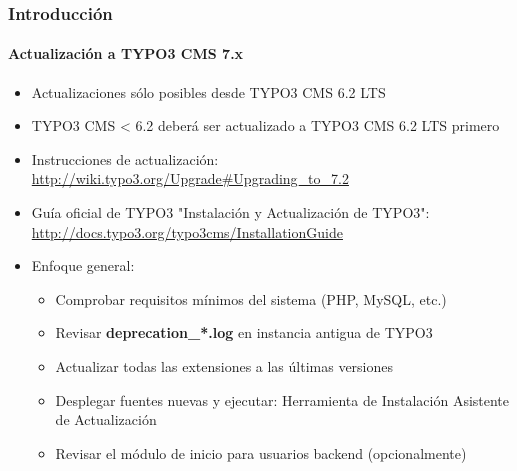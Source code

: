 \begin{frame}[fragile]
	\frametitle{Introducción}
	\framesubtitle{Actualización a TYPO3 CMS 7.x}

	\begin{itemize}
		\item Actualizaciones sólo posibles desde TYPO3 CMS 6.2 LTS
		\item TYPO3 CMS < 6.2 deberá ser actualizado a TYPO3 CMS 6.2 LTS primero
	\end{itemize}

	\begin{itemize}

		\item Instrucciones de actualización:\newline
			\smaller\url{http://wiki.typo3.org/Upgrade#Upgrading_to_7.2}\normalsize
		\item Guía oficial de TYPO3 "Instalación y Actualización de TYPO3":
			\smaller\url{http://docs.typo3.org/typo3cms/InstallationGuide}\normalsize
		\item Enfoque general:
			\begin{itemize}
				\item Comprobar requisitos mínimos del sistema \small(PHP, MySQL, etc.)
				\item Revisar \textbf{deprecation\_*.log} en instancia antigua de TYPO3
				\item Actualizar todas las extensiones a las últimas versiones
				\item Desplegar fuentes nuevas y ejecutar:\newline
					Herramienta de Instalación \textrightarrow Asistente de Actualización
				\item Revisar el módulo de inicio para usuarios backend  (opcionalmente)
			\end{itemize}
	\end{itemize}

\end{frame}

